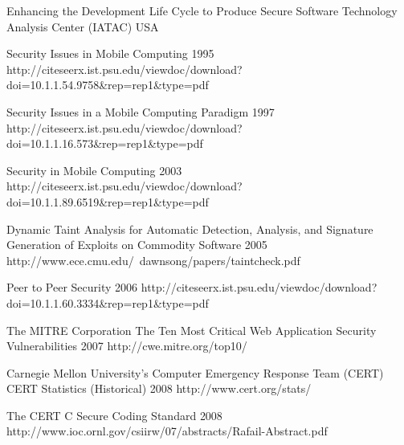 \begin{thebibliography}{9}
		{
			\biband
			}
		{Enhancing the Development Life Cycle to Produce Secure Software}
		{Technology Analysis Center (IATAC)}
		{USA}
		{}



		{}
		{Security Issues in Mobile Computing}	
		{1995}	
		{http://citeseerx.ist.psu.edu/viewdoc/download?doi=10.1.1.54.9758\&rep=rep1\&type=pdf}
		
		{
			\biband
			}
		{Security Issues in a Mobile Computing Paradigm}	
		{1997}	
		{http://citeseerx.ist.psu.edu/viewdoc/download?doi=10.1.1.16.573\&rep=rep1\&type=pdf}
	
		{
			\biband
			\biband
			\biband
			}
		{Security in Mobile Computing}	
		{2003}	
		{http://citeseerx.ist.psu.edu/viewdoc/download?doi=10.1.1.89.6519\&rep=rep1\&type=pdf}

		{
			\biband
			}
		{Dynamic Taint Analysis for Automatic Detection, Analysis, and Signature Generation of Exploits on Commodity Software}	
		{2005}	
		{http://www.ece.cmu.edu/~dawnsong/papers/taintcheck.pdf}
	
		{}
		{Peer to Peer Security}	
		{2006}
		{http://citeseerx.ist.psu.edu/viewdoc/download?doi=10.1.1.60.3334\&rep=rep1\&type=pdf}

		{The MITRE Corporation}
		{The Ten Most Critical Web Application Security Vulnerabilities}
		{2007}
		{http://cwe.mitre.org/top10/}

		{Carnegie Mellon University's Computer Emergency Response Team (CERT)}
		{CERT Statistics (Historical)}
		{2008}
		{http://www.cert.org/stats/}
				
		{
			\biband
			}
		{The {CERT} {C} Secure Coding Standard}
		{2008}
		{http://www.ioc.ornl.gov/csiirw/07/abstracts/Rafail-Abstract.pdf}
		

\end{thebibliography}
